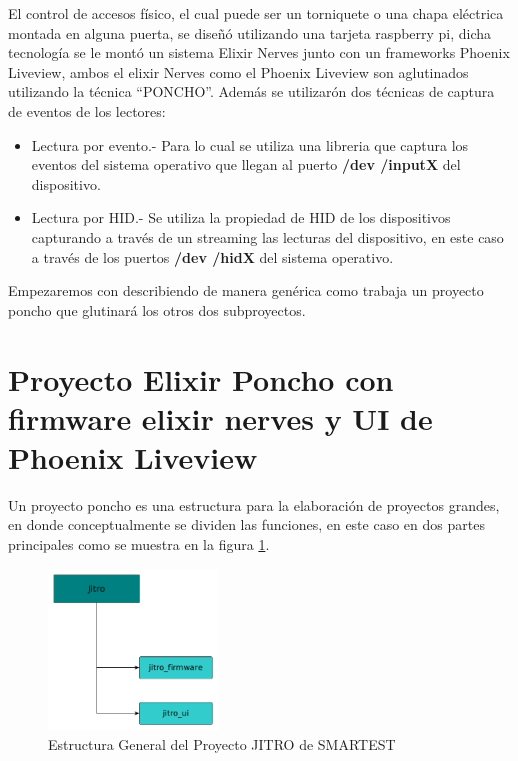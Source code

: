 El control de accesos físico, el cual puede ser un torniquete o una chapa eléctrica montada en alguna puerta, se diseñó utilizando una tarjeta raspberry pi, dicha tecnología se le montó un sistema Elixir Nerves junto con un frameworks Phoenix Liveview, ambos el elixir Nerves como el Phoenix Liveview son aglutinados utilizando la técnica ``PONCHO''. Además se utilizarón dos técnicas de captura de eventos de los lectores:

\begin{itemize}
\item Lectura por evento.- Para lo cual se utiliza una libreria que captura los eventos del sistema operativo que llegan al puerto \textbf{/dev /inputX} del dispositivo.
\item Lectura por HID.- Se utiliza la propiedad de HID de los dispositivos capturando a través de un streaming las lecturas del dispositivo, en este caso a través de los puertos \textbf{/dev /hidX} del sistema operativo.
\end{itemize}

Empezaremos con describiendo de manera genérica como trabaja un proyecto poncho que glutinará los otros dos subproyectos.

\section{Proyecto Elixir Poncho con firmware elixir nerves y UI de Phoenix Liveview}

Un proyecto poncho es una estructura para la elaboración de proyectos grandes, en donde conceptualmente se dividen las funciones, en este caso en dos partes principales como se muestra en la figura \ref{cap2:001}.


\begin{figure}[htb]
\centering
\includegraphics[width=0.4\textwidth]{capitulo2/jitro.png}
\caption{Estructura General del Proyecto JITRO de SMARTEST}
\label{cap2:001}
\end{figure}

